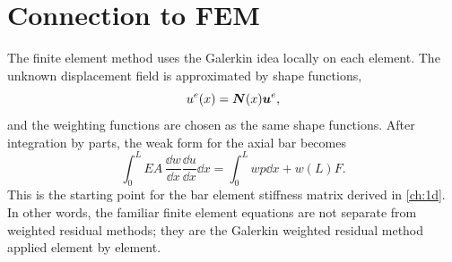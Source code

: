\section{Connection to FEM}

The finite element method uses the Galerkin idea locally on each element. The
unknown displacement field is approximated by shape functions,
\begin{equation}
    u^e(x) = \bm{N}(x)\bm{u}^e ,
\end{equation}
and the weighting functions are chosen as the same shape functions. After
integration by parts, the weak form for the axial bar becomes
\begin{equation}
    \int_0^L EA\, \frac{\dd w}{\dd x}
    \frac{\dd u}{\dd x}\dd x
    =
    \int_0^L w p \dd x + w(L)F .
    \label{eq:wr_weak_form_connection}
\end{equation}
This is the starting point for the bar element stiffness matrix derived in
\cref{ch:1d}. In other words, the familiar finite element equations are not
separate from weighted residual methods; they are the Galerkin weighted residual
method applied element by element.
